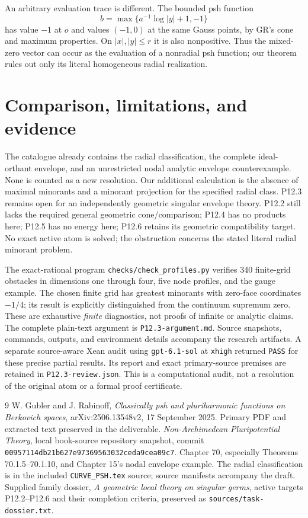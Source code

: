 \documentclass[11pt]{article}
\theoremstyle{definition}
\begin{document}
An arbitrary evaluation trace is different. The bounded psh function
\[
 b=\max\{a^{-1}\log|y|+1,-1\}
\]
has value $-1$ at $o$ and values $(-1,0)$ at the same Gauss points,
by GR's cone and maximum properties. On $|x|,|y|\leq r$ it is also
nonpositive. Thus the mixed-zero vector can occur as the evaluation
of a nonradial psh function; our theorem rules out only its literal
homogeneous radial realization.

\section{Comparison, limitations, and evidence}
The catalogue already contains the radial classification, the complete
ideal-orthant envelope, and an unrestricted nodal analytic envelope
counterexample. None is counted as a new resolution. Our additional
calculation is the absence of maximal minorants and a minorant projection
for the specified radial class. P12.3 remains open for an independently
geometric singular envelope theory. P12.2 still lacks the required
general geometric cone/comparison; P12.4 has no products here; P12.5
has no energy here; P12.6 retains its geometric compatibility target.
No exact active atom is solved; the obstruction concerns the stated literal
radial minorant problem.

The exact-rational program \texttt{checks/check\_profiles.py} verifies
340 finite-grid obstacles in dimensions one through four, five node
profiles, and the gauge example. The chosen finite grid has greatest
minorants with zero-face coordinates $-1/4$; its result is explicitly
distinguished from the continuum supremum zero. These are exhaustive
\emph{finite} diagnostics, not proofs of infinite or analytic claims.
The complete plain-text argument is \texttt{P12.3-argument.md}. Source
snapshots, commands, outputs, and environment details accompany the
research artifacts. A separate source-aware Xean audit using
\texttt{gpt-6.1-sol} at \texttt{xhigh} returned \texttt{PASS} for these
precise partial results. Its report and exact primary-source premises are
retained in \texttt{P12.3-review.json}. This is a computational audit, not
a resolution of the original atom or a formal proof certificate.

\begin{thebibliography}{9}
 W. Gubler and J. Rabinoff,
\emph{Classically psh and pluriharmonic functions on Berkovich spaces},
arXiv:2506.13548v2, 17 September 2025.
Primary PDF and extracted text preserved in the deliverable.
 \emph{Non-Archimedean Pluripotential Theory}, local
book-source repository snapshot, commit
\texttt{00957114db21b627e97369563032ceda9cea09c7}.
Chapter 70, especially Theorems 70.1.5--70.1.10, and Chapter 15's nodal
envelope example. The radial classification is in the included
\texttt{CURVE\_PSH.tex} source; source manifests accompany the draft.
 Supplied family dossier, \emph{A geometric local theory
on singular germs}, active targets P12.2--P12.6 and their completion
criteria, preserved as \texttt{sources/task-dossier.txt}.
\end{thebibliography}
\end{document}
